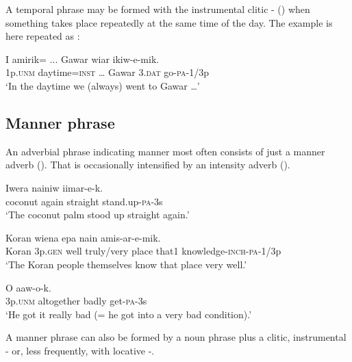 A temporal phrase may be formed with the instrumental clitic - () when something takes place repeatedly at the same time of the day. The example  is here repeated as :

\ea%
\label{ex:4:x1907}
\gll I  amirik=  ...  Gawar  wiar  ikiw-e-mik. \\
  1p.\textsc{unm}  daytime=\textsc{inst}  {\dots}  Gawar  3.\textsc{dat}  go-\textsc{pa}-1/3p    \\
\glt`In the daytime we (always) went to Gawar {\dots}'
\z

\subsection{Manner phrase} \label{sec:4.6.3}
{}
An adverbial phrase indicating manner most often consists of just a manner adverb ().  That is occasionally intensified by an intensity adverb (). 

\ea%
\label{ex:4:x880}
\gll Iwera  nainiw    iimar-e-k. \\
  coconut  again  straight  stand.up-\textsc{pa}-3s    \\
\glt`The coconut palm stood up straight again.'
\z

\ea%
\label{ex:4:x879}
\gll Koran  wiena     epa  nain amis-ar-e-mik.\\
  Koran  3p.\textsc{gen}  well  truly/very  place  that1   knowledge-\textsc{inch}-\textsc{pa}-1/3p\\
\glt`The Koran people themselves know that place very well.'
\z

\ea%
\label{ex:4:x881}
\gll O     aaw-o-k.  \\
  3p.\textsc{unm}  altogether  badly  get-\textsc{pa}-3s    \\
\glt`He got it really bad (= he got into a very bad condition).'
\z

A manner phrase can also be formed by a noun phrase plus a clitic, instrumental \nobreakdash- or, less frequently, with locative -.  

